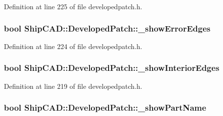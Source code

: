 Definition at line 225 of file developedpatch.\+h.

\subsubsection[{\texorpdfstring{\+\_\+show\+Error\+Edges}{_showErrorEdges}}]{\setlength{\rightskip}{0pt plus 5cm}bool Ship\+C\+A\+D\+::\+Developed\+Patch\+::\+\_\+show\+Error\+Edges\hspace{0.3cm}{\ttfamily [protected]}}\hypertarget{classShipCAD_1_1DevelopedPatch_af20d320001ec91d649b59488bf08000e}{}\label{classShipCAD_1_1DevelopedPatch_af20d320001ec91d649b59488bf08000e}


Definition at line 224 of file developedpatch.\+h.

\subsubsection[{\texorpdfstring{\+\_\+show\+Interior\+Edges}{_showInteriorEdges}}]{\setlength{\rightskip}{0pt plus 5cm}bool Ship\+C\+A\+D\+::\+Developed\+Patch\+::\+\_\+show\+Interior\+Edges\hspace{0.3cm}{\ttfamily [protected]}}\hypertarget{classShipCAD_1_1DevelopedPatch_a7ac65e1c08ede7d63c94b4da7bfe6443}{}\label{classShipCAD_1_1DevelopedPatch_a7ac65e1c08ede7d63c94b4da7bfe6443}


Definition at line 219 of file developedpatch.\+h.

\subsubsection[{\texorpdfstring{\+\_\+show\+Part\+Name}{_showPartName}}]{\setlength{\rightskip}{0pt plus 5cm}bool Ship\+C\+A\+D\+::\+Developed\+Patch\+::\+\_\+show\+Part\+Name\hspace{0.3cm}{\ttfamily [protected]}}\hypertarget{classShipCAD_1_1DevelopedPatch_a18bd449dd6e474499a1fb28f20140919}{}\label{classShipCAD_1_1DevelopedPatch_a18bd449dd6e474499a1fb28f20140919}


